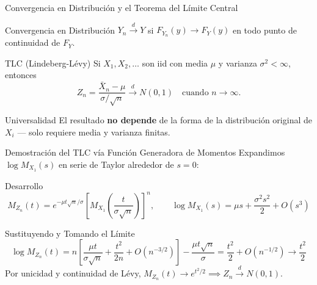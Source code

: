 \documentclass[10pt, aspectratio=169]{beamer}
\begin{document}
\begin{frame}{Convergencia en Distribución y el Teorema del Límite Central}
  \footnotesize
  \begin{block}{Convergencia en Distribución}
    $Y_n \xrightarrow{d} Y$ si $F_{Y_n}(y) \to F_Y(y)$ en todo punto de continuidad de $F_Y$.
  \end{block}
  \pause

  \vspace{0.1cm}
  \begin{block}{TLC (Lindeberg-Lévy)}
    Si $X_1,X_2,\ldots$ son iid con media $\mu$ y varianza $\sigma^2<\infty$, entonces
    $$Z_n = \dfrac{\bar{X}_n-\mu}{\sigma/\sqrt{n}} \xrightarrow{d} N(0,1) \quad \text{cuando } n\to\infty.$$
  \end{block}

  \vspace{0.1cm}
  \pause
  \begin{alertblock}{Universalidad}
    El resultado \textbf{no depende} de la forma de la distribución original de $X_i$ --- solo requiere media y varianza finitas.
  \end{alertblock}
\end{frame}

\begin{frame}{Demostración del TLC vía Función Generadora de Momentos}
  \footnotesize
  Expandimos $\log M_{X_1}(s)$ en serie de Taylor alrededor de $s=0$: \pause

  \vspace{0.1cm}
  \begin{block}{Desarrollo}
    $$M_{Z_n}(t) = e^{-\mu t\sqrt{n}/\sigma}\left[M_{X_1}\!\left(\dfrac{t}{\sigma\sqrt{n}}\right)\right]^n, \qquad \log M_{X_1}(s) = \mu s + \dfrac{\sigma^2 s^2}{2}+O(s^3)$$
  \end{block}

  \vspace{0.1cm}
  \pause
  \begin{alertblock}{Sustituyendo y Tomando el Límite}
    $$\log M_{Z_n}(t) = n\left[\dfrac{\mu t}{\sigma\sqrt{n}}+\dfrac{t^2}{2n}+O(n^{-3/2})\right] - \dfrac{\mu t\sqrt{n}}{\sigma} = \dfrac{t^2}{2}+O(n^{-1/2}) \to \dfrac{t^2}{2}$$
    Por unicidad y continuidad de Lévy, $M_{Z_n}(t)\to e^{t^2/2} \implies Z_n \xrightarrow{d} N(0,1)$.
  \end{alertblock}
\end{frame}
\end{document}
